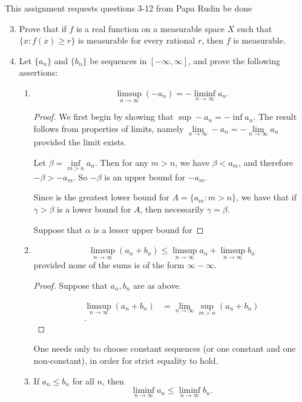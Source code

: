 \documentclass{article}
\begin{document}
This assignment requests questions 3-12 from Papa Rudin be done
\begin{enumerate} 

    \setcounter{enumi}{2}
    \item Prove that if $f$ is a real function on a measurable space $X$ such that $\{x : f(x) \geq r\}$ is measurable for every rational $r$, then $f$ is measurable.
    \item  Let $\{a_n\}$ and $\{b_n\}$ be sequences in $[-\infty, \infty]$, and prove the following assertions:
\begin{enumerate}
    \item $$\limsup_{n \to \infty} (-a_n) = -\liminf_{n \to \infty} a_n.$$
        \begin{proof} 
            
        We first begin by showing that $\sup -a_n = -\inf a_n$. The result follows from properties of limits, namely $\lim\limits_{n \to \infty} -a_n=-\lim\limits_{n \to \infty} a_n$ provided the limit exists.

        Let $\beta=\inf\limits_{m>n}a_n$. Then for any $m>n$, we have $\beta<a_m$, and therefore $-\beta>-a_m$. So $-\beta$ is an upper bound for $-a_m$.

        Since is the greatest lower bound for $A=\{ a_m :m>n\}$, we have that if $\gamma>\beta$ is a lower bound for $A$, then necessarily $\gamma=\beta$.

        Suppose that $\alpha$ is a lesser upper bound for %
        \end{proof}
    \item $$ \limsup_{n \to \infty} (a_n + b_n) \leq \limsup_{n \to \infty} a_n + \limsup_{n \to \infty} b_n$$ provided none of the sums is of the form $\infty - \infty$.
        \begin{proof} 
            Suppose that $a_n,b_n$ are as above.

            \begin{align*}
                \limsup_{n \to \infty} (a_n + b_n) &= \lim_{n \to \infty} \sup_{m>n}(a_n+b_n) \\
            .\end{align*}

        \end{proof}

        One needs only to choose constant sequences (or one constant and one non-constant), in order for strict equality to hold.
    \item If $a_n \leq b_n$ for all $n$, then
    $$\liminf_{n \to \infty} a_n \leq \liminf_{n \to \infty} b_n.$$
\end{enumerate}

\end{enumerate}
\end{document}
